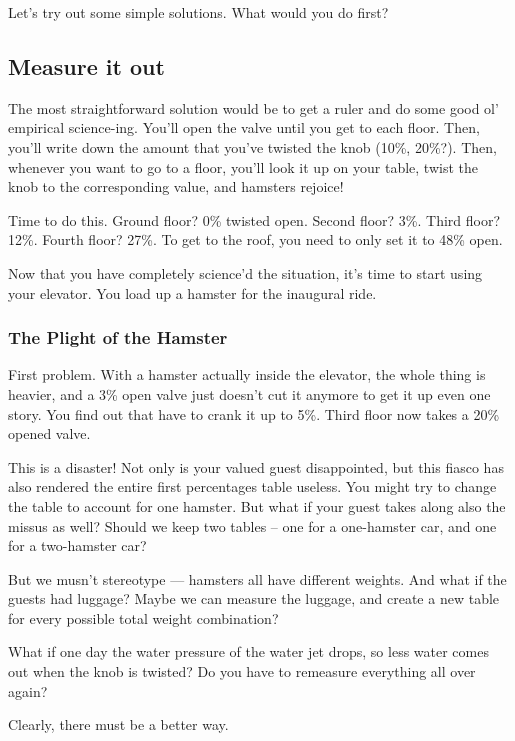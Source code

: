 \documentclass[]{article}
\begin{document}
Let's try out some simple solutions. What would you do first?

\subsection{Measure it out}\label{measure-it-out}

The most straightforward solution would be to get a ruler and do some good ol' empirical
science-ing. You'll open the valve until you get to each floor. Then, you'll write down the amount
that you've twisted the knob (10\%, 20\%?). Then, whenever you want to go to a floor, you'll look it
up on your table, twist the knob to the corresponding value, and hamsters rejoice!

Time to do this. Ground floor? 0\% twisted open. Second floor? 3\%. Third floor? 12\%. Fourth floor?
27\%. To get to the roof, you need to only set it to 48\% open.

Now that you have completely science'd the situation, it's time to start using your elevator. You
load up a hamster for the inaugural ride.

\subsubsection{The Plight of the Hamster}\label{the-plight-of-the-hamster}

First problem. With a hamster actually inside the elevator, the whole thing is heavier, and a 3\%
open valve just doesn't cut it anymore to get it up even one story. You find out that have to crank
it up to 5\%. Third floor now takes a 20\% opened valve.

This is a disaster! Not only is your valued guest disappointed, but this fiasco has also rendered
the entire first percentages table useless. You might try to change the table to account for one
hamster. But what if your guest takes along also the missus as well? Should we keep two tables --
one for a one-hamster car, and one for a two-hamster car?

But we musn't stereotype --- hamsters all have different weights. And what if the guests had
luggage? Maybe we can measure the luggage, and create a new table for every possible total weight
combination?

What if one day the water pressure of the water jet drops, so less water comes out when the knob is
twisted? Do you have to remeasure everything all over again?

Clearly, there must be a better way.
\end{document}
